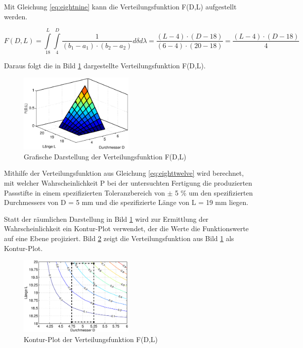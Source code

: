 \noindent Mit Gleichung \eqref{eq:eightnine} kann die Verteilungsfunktion F(D,L) aufgestellt werden. 

\begin{equation}\label{eq:eighttwelve}
F(D,L)=\int\limits _{18}^{L}\int\limits _{4}^{D}\dfrac{1}{(b_{1} -a_{1})\cdot (b_{2} -a_{2})} d\delta d\lambda =\dfrac{(L-4)\cdot (D-18)}{(6-4)\cdot (20-18)} =\dfrac{(L-4)\cdot (D-18)}{4}
\end{equation}

\noindent Daraus folgt die in Bild \ref{fig:Passstifte2} dargestellte Verteilungsfunktion F(D,L).

\noindent 
\begin{figure}[H]
  \centerline{\includegraphics[width=0.5\textwidth]{Kapitel8/Bilder/image4}}
  \caption{Grafische Darstellung der Verteilungsfunktion F(D,L)}
  \label{fig:Passstifte2}
\end{figure}

\noindent Mithilfe der Verteilungsfunktion aus Gleichung \eqref{eq:eighttwelve} wird berechnet, mit welcher Wahrscheinlichkeit P bei der untersuchten Fertigung die produzierten Passstifte in einem spezifizierten Toleranzbereich von $ \pm $ 5 \% um den spezifizierten Durchmessers von D = 5 mm und die spezifizierte L\"{a}nge von L = 19 mm liegen.\newline

\noindent Statt der r\"{a}umlichen Darstellung in Bild \ref{fig:Passstifte2} wird zur Ermittlung der Wahrscheinlichkeit ein Kontur-Plot verwendet, der die Werte die Funktionswerte auf eine Ebene projiziert. Bild \ref{fig:Passstifte3} zeigt die Verteilungsfunktion aus Bild \ref{fig:Passstifte2} als Kontur-Plot.

\noindent 
\begin{figure}[H]
  \centerline{\includegraphics[width=0.5\textwidth]{Kapitel8/Bilder/image5}}
  \caption{Kontur-Plot der Verteilungsfunktion F(D,L)}
  \label{fig:Passstifte3}
\end{figure}

